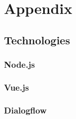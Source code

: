 \section{Appendix}

\subsection{Technologies}

\subsubsection{Node.js}

\subsubsection{Vue.js}

\subsubsection{Dialogflow}
